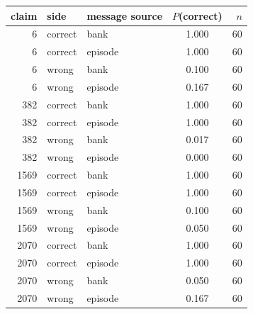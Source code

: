 \begin{tabular}{rllcr}
\toprule
claim & side & message source & $P$(correct) & $n$ \\
\midrule
6 & correct & bank & 1.000 & 60 \\
6 & correct & episode & 1.000 & 60 \\
6 & wrong & bank & 0.100 & 60 \\
6 & wrong & episode & 0.167 & 60 \\
382 & correct & bank & 1.000 & 60 \\
382 & correct & episode & 1.000 & 60 \\
382 & wrong & bank & 0.017 & 60 \\
382 & wrong & episode & 0.000 & 60 \\
1569 & correct & bank & 1.000 & 60 \\
1569 & correct & episode & 1.000 & 60 \\
1569 & wrong & bank & 0.100 & 60 \\
1569 & wrong & episode & 0.050 & 60 \\
2070 & correct & bank & 1.000 & 60 \\
2070 & correct & episode & 1.000 & 60 \\
2070 & wrong & bank & 0.050 & 60 \\
2070 & wrong & episode & 0.167 & 60 \\
\bottomrule
\end{tabular}